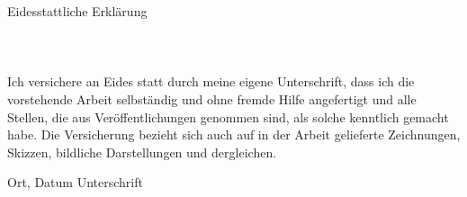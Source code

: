 \documentclass{article}
\theoremstyle{definition}
\begin{document}
\newpage

%
%
%
%
%
%
%
%
%
%
%


%

%
%




\newpage %
\hfil Eidesstattliche Erklärung
\\ ~\ \\ ~\ \\ ~\ \\
Ich versichere an Eides statt durch meine eigene Unterschrift, dass ich die vorstehende Arbeit selbständig und ohne fremde Hilfe angefertigt und alle Stellen, die aus Veröffentlichungen genommen sind, als solche kenntlich gemacht habe. Die Versicherung bezieht sich auch auf in der Arbeit gelieferte Zeichnungen, Skizzen, bildliche Darstellungen und dergleichen. 

\vspace{4cm}

\hspace{2cm} Ort, Datum \hfill Unterschrift \hspace{2cm}

\end{document}
